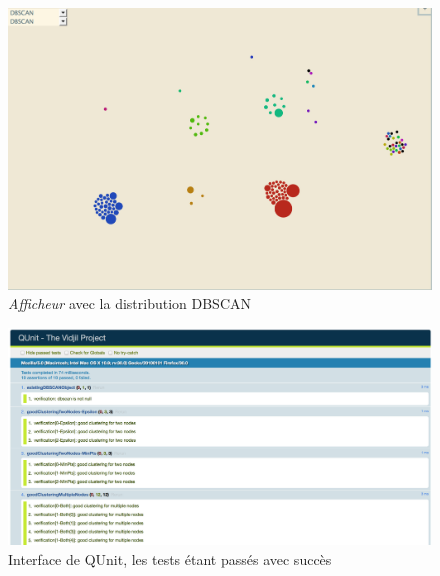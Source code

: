 \documentclass[12pt]{report}
\begin{document}
\begin{spacing}{1.2}
\begin{figure}[h]
\begin{center}
	\includegraphics[scale=0.57]{img/DBSCAN-Ex.jpg}
\end{center}
\caption{\textit{Afficheur} avec la distribution DBSCAN}
\end{figure}

\begin{figure}[h]
\begin{center}
	\includegraphics[scale=0.35]{img/QUnit.jpg}
\end{center}
\caption{Interface de QUnit, les tests étant passés avec succès}
\end{figure}

\end{spacing}
\end{document}
